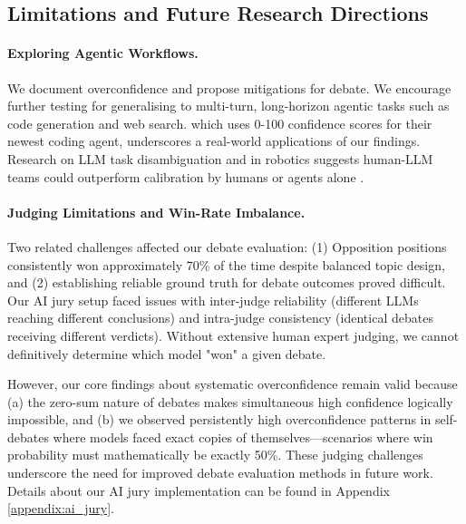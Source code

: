 \documentclass{article}
\begin{document}
\subsection{Limitations and Future Research Directions}
\label{subsec:limitations_future}

\paragraph{Exploring Agentic Workflows.} We document overconfidence and propose mitigations for debate. We encourage further testing for generalising to multi-turn, long-horizon agentic tasks such as code generation and web search. \citet{cognitionlabs_devin21_2025} which uses 0-100 confidence scores for their newest coding agent, underscores a real-world applications of our findings. Research on LLM task disambiguation \citep{hu2024uncertaintythoughtsuncertaintyawareplanning,kobalczyk2025activetaskdisambiguationllms} and in robotics \citep{liang2025introspectiveplanningaligningrobots,ren2023robotsaskhelpuncertainty} suggests human-LLM teams could outperform calibration by humans or agents alone \citep{roldan2025genai}.

\paragraph{Judging Limitations and Win-Rate Imbalance.} Two related challenges affected our debate evaluation: (1) Opposition positions consistently won approximately 70\% of the time despite balanced topic design, and (2) establishing reliable ground truth for debate outcomes proved difficult. Our AI jury setup faced issues with inter-judge reliability (different LLMs reaching different conclusions) and intra-judge consistency (identical debates receiving different verdicts). Without extensive human expert judging, we cannot definitively determine which model "won" a given debate.

However, our core findings about systematic overconfidence remain valid because (a) the zero-sum nature of debates makes simultaneous high confidence logically impossible, and (b) we observed persistently high overconfidence patterns in self-debates where models faced exact copies of themselves—scenarios where win probability must mathematically be exactly 50\%. These judging challenges underscore the need for improved debate evaluation methods in future work. Details about our AI jury implementation can be found in Appendix \ref{appendix:ai_jury}.
\end{document}
